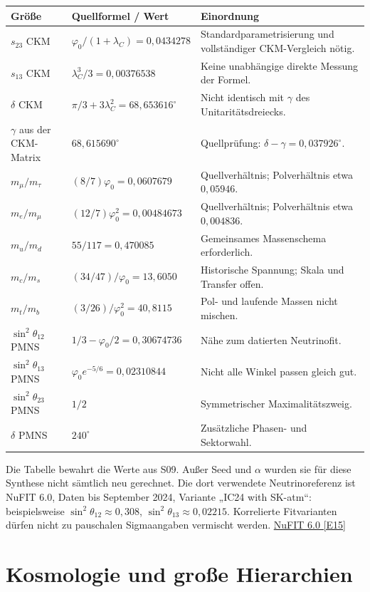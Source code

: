 \begin{longtable}{L{35mm}L{48mm}L{67mm}}
\toprule \textbf{Größe}&\textbf{Quellformel / Wert}&\textbf{Einordnung}\\\midrule\endhead
$s_{23}$ CKM&$\varphi_0/(1+\lambda_C)=0{,}0434278$&Standardparametrisierung und vollständiger CKM-Vergleich nötig.\\
$s_{13}$ CKM&$\lambda_C^3/3=0{,}00376538$&Keine unabhängige direkte Messung der Formel.\\
$\delta$ CKM&$\pi/3+3\lambda_C^2=68{,}653616^\circ$&Nicht identisch mit $\gamma$ des Unitaritätsdreiecks.\\
$\gamma$ aus der CKM-Matrix&$68{,}615690^\circ$&Quellprüfung: $\delta-\gamma=0{,}037926^\circ$.\\
$m_\mu/m_\tau$&$(8/7)\varphi_0=0{,}0607679$&Quellverhältnis; Polverhältnis etwa $0{,}05946$.\\
$m_e/m_\mu$&$(12/7)\varphi_0^2=0{,}00484673$&Quellverhältnis; Polverhältnis etwa $0{,}004836$.\\
$m_u/m_d$&$55/117=0{,}470085$&Gemeinsames Massenschema erforderlich.\\
$m_c/m_s$&$(34/47)/\varphi_0=13{,}6050$&Historische Spannung; Skala und Transfer offen.\\
$m_t/m_b$&$(3/26)/\varphi_0^2=40{,}8115$&Pol- und laufende Massen nicht mischen.\\
$\sin^2\theta_{12}$ PMNS&$1/3-\varphi_0/2=0{,}30674736$&Nähe zum datierten Neutrinofit.\\
$\sin^2\theta_{13}$ PMNS&$\varphi_0e^{-5/6}=0{,}02310844$&Nicht alle Winkel passen gleich gut.\\
$\sin^2\theta_{23}$ PMNS&$1/2$&Symmetrischer Maximalitätszweig.\\
$\delta$ PMNS&$240^\circ$&Zusätzliche Phasen- und Sektorwahl.\\\bottomrule
\end{longtable}
Die Tabelle bewahrt die Werte aus S09. Außer Seed und $\alpha$ wurden sie für diese Synthese nicht sämtlich neu gerechnet. Die dort verwendete Neutrinoreferenz ist NuFIT 6.0, Daten bis September 2024, Variante „IC24 with SK-atm“: beispielsweise $\sin^2\theta_{12}\approx0{,}308$, $\sin^2\theta_{13}\approx0{,}02215$. Korrelierte Fitvarianten dürfen nicht zu pauschalen Sigmaangaben vermischt werden. \href{https://arxiv.org/abs/2410.05380}{NuFIT 6.0 [E15]}

\section{Kosmologie und große Hierarchien}


